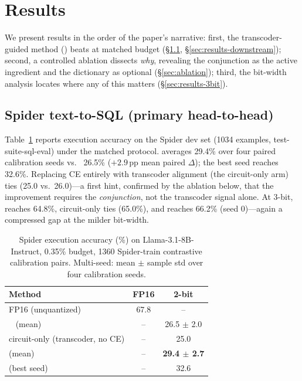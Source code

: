 \section{Results}
\label{sec:results}

We present results in the order of the paper's narrative: first, the
transcoder-guided method (\method{}) beats \baseline{} at matched budget
(\S\ref{sec:results-spider}, \S\ref{sec:results-downstream}); second, a
controlled ablation dissects \emph{why}, revealing the conjunction as the
active ingredient and the dictionary as optional (\S\ref{sec:ablation});
third, the bit-width analysis locates where any of this matters
(\S\ref{sec:results-3bit}).

\subsection{Spider text-to-SQL (primary head-to-head)}
\label{sec:results-spider}

Table~\ref{tab:spider} reports execution accuracy on the Spider dev set (1034
examples, test-suite-sql-eval) under the matched protocol. \method{} averages
29.4\% over four paired calibration seeds vs.\ \baseline{} 26.5\%
($+2.9$\,pp mean paired $\Delta$); the best seed reaches 32.6\%. Replacing CE
entirely with transcoder alignment (the circuit-only arm) ties \baseline{}
(25.0 vs.\ 26.0)---a
first hint, confirmed by the ablation below, that the improvement requires the
\emph{conjunction}, not the transcoder signal alone. At 3-bit, \baseline{}
reaches 64.8\%, circuit-only ties (65.0\%), and \method{} reaches 66.2\%
(seed 0)---again a compressed gap at the milder bit-width.

\begin{table}[t]
\centering
\caption{Spider execution accuracy (\%) on Llama-3.1-8B-Instruct, 0.35\%
budget, 1360 Spider-train contrastive calibration pairs. Multi-seed: mean $\pm$
sample std over four calibration seeds.}
\label{tab:spider}
\begin{tabular}{lcc}
\toprule
Method & FP16 & 2-bit \\
\midrule
FP16 (unquantized)          & 67.8 & --   \\
\baseline{}~\citep{xiao2025tacq} (mean) & -- & 26.5 $\pm$ 2.0 \\
circuit-only (transcoder, no CE) & -- & 25.0 \\
\method{} (mean)            & --   & \textbf{29.4 $\pm$ 2.7} \\
\method{} (best seed)       & --   & 32.6 \\
\bottomrule
\end{tabular}
\end{table}

